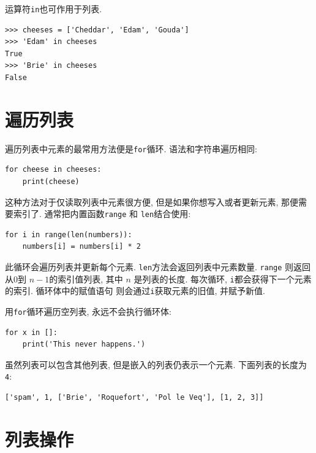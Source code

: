 \documentclass[10pt]{book}
\begin{document}

运算符{\tt in}也可作用于列表. 

\begin{verbatim}
>>> cheeses = ['Cheddar', 'Edam', 'Gouda']
>>> 'Edam' in cheeses
True
>>> 'Brie' in cheeses
False
\end{verbatim}


\section{遍历列表}

遍历列表中元素的最常用方法便是{\tt for}循环. 语法和字符串遍历相同:

\begin{verbatim}
for cheese in cheeses:
    print(cheese)
\end{verbatim}
%
这种方法对于仅读取列表中元素很方便, 但是如果你想写入或者更新元素, 
那便需要索引了. 
通常把内置函数{\tt range} 和 {\tt len}结合使用:

\begin{verbatim}
for i in range(len(numbers)):
    numbers[i] = numbers[i] * 2
\end{verbatim}
%

此循环会遍历列表并更新每个元素. 
{\tt len}方法会返回列表中元素数量. {\tt range} 则返回从0到 $n-1$的索引值列表, 
其中 $n$ 是列表的长度. 
每次循环, {\tt i}都会获得下一个元素的索引. 循环体中的赋值语句
则会通过{\tt i}获取元素的旧值, 并赋予新值. 

用{\tt for}循环遍历空列表, 永远不会执行循环体:

\begin{verbatim}
for x in []:
    print('This never happens.')
\end{verbatim}
%
虽然列表可以包含其他列表, 但是嵌入的列表仍表示一个元素. 
下面列表的长度为{\tt 4}:

\begin{verbatim}
['spam', 1, ['Brie', 'Roquefort', 'Pol le Veq'], [1, 2, 3]]
\end{verbatim}



\section{列表操作}
\end{document}
